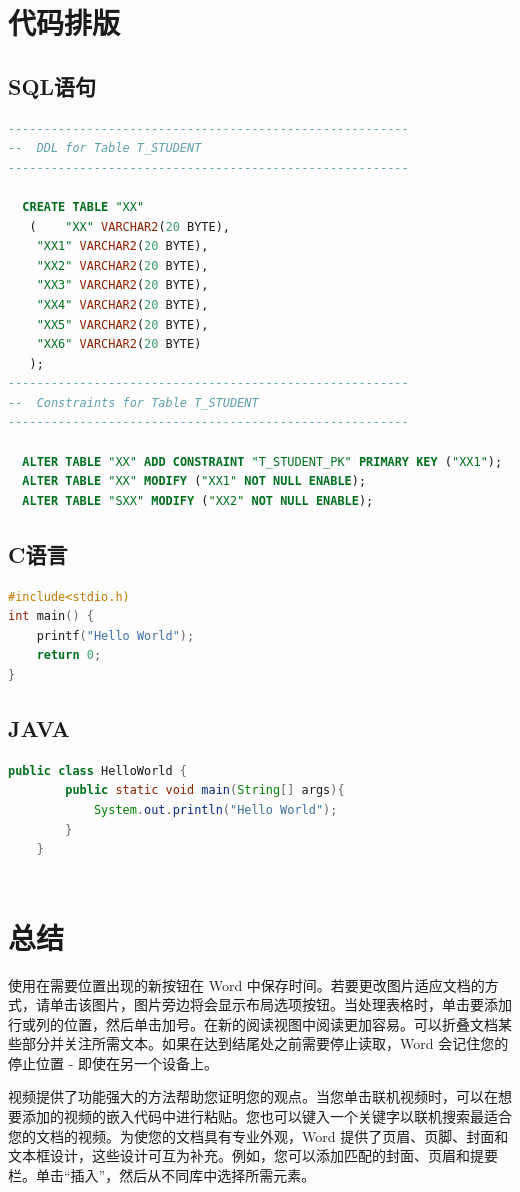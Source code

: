 \documentclass[fontset=windows]{ctexart}
\numberwithin{figure}{section}
\begin{document}
\section{代码排版}
\subsection{SQL语句}

\begin{lstlisting}[language=SQL,escapeinside=``]
--------------------------------------------------------
--  DDL for Table T_STUDENT
--------------------------------------------------------

  CREATE TABLE "XX" 
   (	"XX" VARCHAR2(20 BYTE), 
	"XX1" VARCHAR2(20 BYTE), 
	"XX2" VARCHAR2(20 BYTE), 
	"XX3" VARCHAR2(20 BYTE), 
	"XX4" VARCHAR2(20 BYTE), 
	"XX5" VARCHAR2(20 BYTE), 
	"XX6" VARCHAR2(20 BYTE)
   );
--------------------------------------------------------
--  Constraints for Table T_STUDENT
--------------------------------------------------------

  ALTER TABLE "XX" ADD CONSTRAINT "T_STUDENT_PK" PRIMARY KEY ("XX1");
  ALTER TABLE "XX" MODIFY ("XX1" NOT NULL ENABLE);
  ALTER TABLE "SXX" MODIFY ("XX2" NOT NULL ENABLE);

\end{lstlisting}


\subsection{C语言}
\begin{lstlisting}[language=C,escapeinside=``]
#include<stdio.h)
int main() {
	printf("Hello World");
	return 0;
}
\end{lstlisting}
\subsection{JAVA}
\begin{lstlisting}[language=JAVA,escapeinside=``]
	public class HelloWorld {
		public static void main(String[] args){
			System.out.println("Hello World");
		}
	}
	
\end{lstlisting}



\newpage
\section{总结}
使用在需要位置出现的新按钮在 Word 中保存时间。若要更改图片适应文档的方式，请单击该图片，图片旁边将会显示布局选项按钮。当处理表格时，单击要添加行或列的位置，然后单击加号。在新的阅读视图中阅读更加容易。可以折叠文档某些部分并关注所需文本。如果在达到结尾处之前需要停止读取，Word 会记住您的停止位置 - 即使在另一个设备上。
\par 视频提供了功能强大的方法帮助您证明您的观点。当您单击联机视频时，可以在想要添加的视频的嵌入代码中进行粘贴。您也可以键入一个关键字以联机搜索最适合您的文档的视频。为使您的文档具有专业外观，Word 提供了页眉、页脚、封面和文本框设计，这些设计可互为补充。例如，您可以添加匹配的封面、页眉和提要栏。单击“插入”，然后从不同库中选择所需元素。
\end{document}
